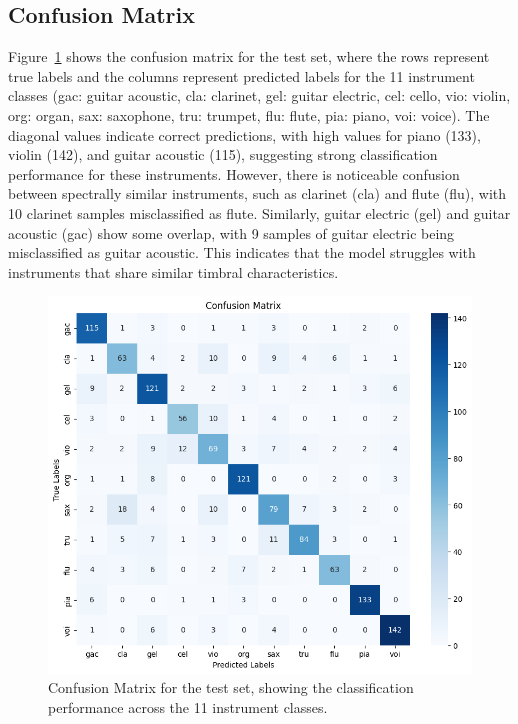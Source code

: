 \documentclass[conference]{IEEEtran}
\begin{document}
\subsection{Confusion Matrix}
Figure~\ref{fig:confusion_matrix} shows the confusion matrix for the test set, where the rows represent true labels and the columns represent predicted labels for the 11 instrument classes (gac: guitar acoustic, cla: clarinet, gel: guitar electric, cel: cello, vio: violin, org: organ, sax: saxophone, tru: trumpet, flu: flute, pia: piano, voi: voice). The diagonal values indicate correct predictions, with high values for piano (133), violin (142), and guitar acoustic (115), suggesting strong classification performance for these instruments. However, there is noticeable confusion between spectrally similar instruments, such as clarinet (cla) and flute (flu), with 10 clarinet samples misclassified as flute. Similarly, guitar electric (gel) and guitar acoustic (gac) show some overlap, with 9 samples of guitar electric being misclassified as guitar acoustic. This indicates that the model struggles with instruments that share similar timbral characteristics.

\begin{figure}[h]
    \centering
    \includegraphics[width=0.9\columnwidth]{confusionmatrix.png}
    \caption{Confusion Matrix for the test set, showing the classification performance across the 11 instrument classes.}
    \label{fig:confusion_matrix}
\end{figure}
\end{document}
